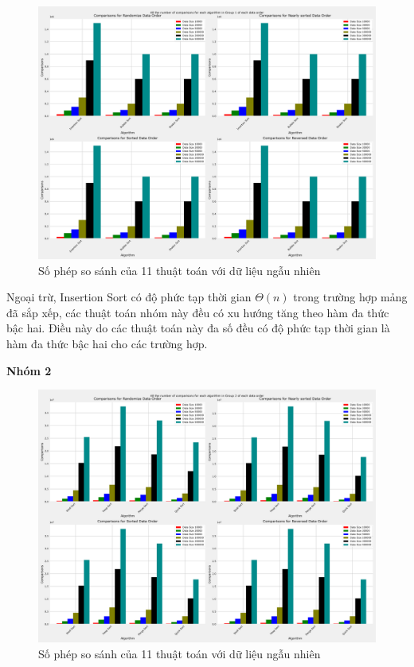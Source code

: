 \begin{figure}[H]
    \centering
    \includegraphics[width=\textwidth]{experimental_result/images/all_the_number_of_comparisons_for_each_algorithm_in_group_1_of_each_data_order.png}
    \caption{Số phép so sánh của 11 thuật toán với dữ liệu ngẫu nhiên}
    \label{fig:all_the_number_of_comparisons_for_each_algorithm_in_group_1_of_each_data_order}
\end{figure}

Ngoại trừ, Insertion Sort có độ phức tạp thời gian $\Theta(n)$ trong trường hợp mảng đã sắp xếp, các thuật toán nhóm này đều có xu hướng tăng theo hàm đa thức bậc hai. Điều này do các thuật toán này đa số đều có độ phức tạp thời gian là hàm đa thức bậc hai cho các trường hợp. 


\textbf{Nhóm 2}

\begin{figure}[H]
    \centering
    \includegraphics[width=\textwidth]{experimental_result/images/all_the_number_of_comparisons_for_each_algorithm_in_group_2_of_each_data_order.png}
    \caption{Số phép so sánh của 11 thuật toán với dữ liệu ngẫu nhiên}
    \label{fig:all_the_number_of_comparisons_for_each_algorithm_in_group_2_of_each_data_order}
\end{figure}

